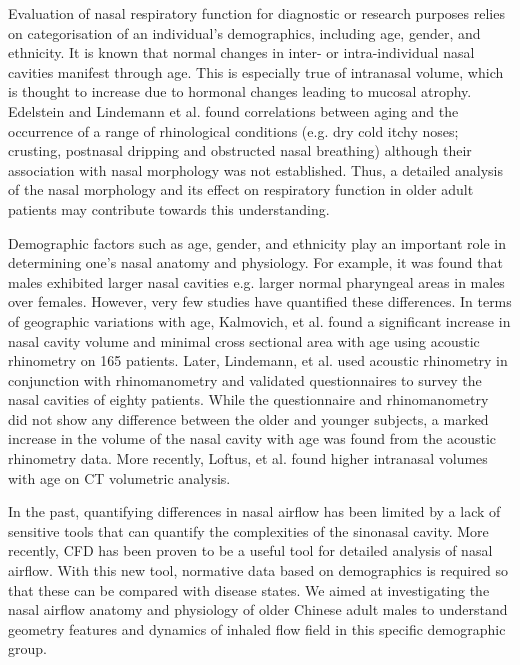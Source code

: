 Evaluation of nasal respiratory function for diagnostic or research purposes relies on categorisation of an individual's demographics, including age, gender, and ethnicity. It is known that normal changes in inter- or intra-individual nasal cavities manifest through age. This is especially true of intranasal volume, which is thought to increase due to hormonal changes leading to mucosal atrophy\cite{Kalmovich2005, Lindemann2010}. Edelstein\cite{Edelstein1996}  and Lindemann et al.\cite{Lindemann2008}  found correlations between aging and the occurrence of a range of rhinological conditions (e.g. dry cold itchy noses; crusting, postnasal dripping and obstructed nasal breathing) although their association with nasal morphology was not established. Thus, a detailed analysis of the nasal morphology and its effect on respiratory function in older adult patients may contribute towards this understanding.

Demographic factors such as age, gender, and ethnicity play an important role in
determining one’s nasal anatomy and physiology. For example, it was found that males exhibited larger nasal cavities e.g. larger normal pharyngeal areas in males over females\cite{Huang1998, BROOKS1992}. However, very few studies have quantified these differences. In terms of geographic variations with age, Kalmovich, et al.\cite{Kalmovich2005} found a significant increase in nasal cavity volume and minimal cross sectional area with age using acoustic rhinometry on 165 patients. Later, Lindemann, et al.\cite{Lindemann2010} used acoustic rhinometry in conjunction with rhinomanometry and validated questionnaires to survey the nasal cavities of eighty patients. While the questionnaire and rhinomanometry did not show any difference between the older and younger subjects, a marked increase in the volume of the nasal cavity with age was found from the acoustic rhinometry data. More recently, Loftus, et al.\cite{Loftus2016}  found higher intranasal volumes with age on CT volumetric analysis.

In the past, quantifying differences in nasal airflow has been limited by a lack of sensitive tools that can quantify the complexities of the sinonasal cavity. More recently, CFD has been proven to be a useful tool for detailed analysis of nasal airflow. With this new tool, normative data based on demographics is required so that these can be compared with disease states. We aimed at investigating the nasal airflow anatomy and physiology of older Chinese adult males to understand geometry features and dynamics of inhaled flow field in this specific demographic group.

